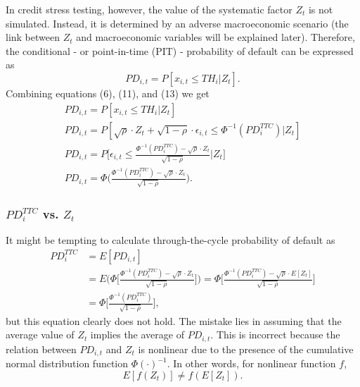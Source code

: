 \documentclass[11pt,a4paper]{article}
\begin{document}
In credit stress testing, however, the value of the systematic factor $Z_t$ is not simulated. Instead, it is determined by an adverse macroeconomic scenario (the link between $Z_t$ and macroeconomic variables will be explained later). Therefore, the conditional - or point-in-time (PIT) - probability of default can be expressed as
\begin{equation}
PD_{i, t} = P[x_{i, t} \le TH_i | Z_t].
\end{equation}
Combining equations (6), (11), and (13) we get
\begin{equation}
\begin{aligned}
PD_{i, t} = P[x_{i, t} \le TH_i| Z_t] \\
PD_{i, t} = P[\sqrt{\rho} \cdot Z_t + \sqrt{1 - \rho} \cdot \epsilon_{i, t} \le \Phi^{-1}(PD_i^{TTC}) | Z_t] \\
PD_{i, t} = P\Bigg[\epsilon_{i, t} \le \frac{\Phi^{-1}(PD_i^{TTC}) - \sqrt{\rho} \cdot Z_t}{\sqrt{1 - \rho}} | Z_t \Bigg] \\
PD_{i, t} = \Phi \Bigg(\frac{\Phi^{-1}(PD_i^{TTC}) - \sqrt{\rho} \cdot Z_t}{\sqrt{1 - \rho}} \Bigg).
\end{aligned}
\end{equation}

\subsubsection{$PD_i^{TTC}$ vs. $Z_t$}

It might be tempting to calculate through-the-cycle probability of default as
\begin{align}
PD_i^{TTC} &= E[PD_{i, t}] \nonumber \\
&= E\Bigg(\Phi \Bigg[\frac{\Phi^{-1}(PD_i^{TTC}) - \sqrt{\rho} \cdot Z_t}{\sqrt{1 - \rho}} \Bigg]\Bigg) = \Phi \Bigg[\frac{\Phi^{-1}(PD_i^{TTC}) - \sqrt{\rho} \cdot E[Z_t]}{\sqrt{1 - \rho}} \Bigg] \\
&= \Phi \Bigg[\frac{\Phi^{-1}(PD_i^{TTC})}{\sqrt{1 - \rho}} \Bigg] \nonumber,
\end{align}
but this equation clearly does not hold. The mistake lies in assuming that the average value of $Z_t$ implies the average of $PD_{i, t}$. This is incorrect because the relation between $PD_{i, t}$ and $Z_t$ is nonlinear due to the presence of the cumulative normal distribution function $\Phi(\cdot)^{-1}$. In other words, for nonlinear function $f$,
\begin{equation}
E[f(Z_t)] \ne f(E[Z_t]).
\end{equation}
\end{document}
